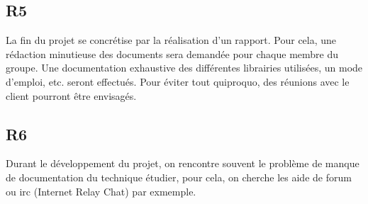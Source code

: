 \documentclass[a4paper,11pt,french]{article}
\begin{document}
\subsection*{R5}
La fin du projet se concrétise par la réalisation d'un rapport. Pour cela, une
rédaction minutieuse des documents sera demandée pour chaque membre du groupe.
Une documentation exhaustive des différentes librairies utilisées, un mode
d'emploi, etc. seront effectués. Pour éviter tout quiproquo, des réunions avec
le client pourront être envisagés.


\subsection*{R6}
Durant le développement du projet, on rencontre souvent le problème de manque de 
documentation du technique étudier, pour cela, on cherche les aide de forum ou 
irc (Internet Relay Chat) par exmemple.
\end{document}
